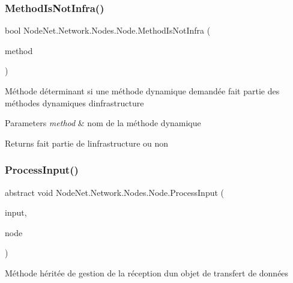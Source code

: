 \subsubsection{\texorpdfstring{Method\+Is\+Not\+Infra()}{MethodIsNotInfra()}}
{\footnotesize\ttfamily bool Node\+Net.\+Network.\+Nodes.\+Node.\+Method\+Is\+Not\+Infra (\begin{DoxyParamCaption}\item[{string}]{method }\end{DoxyParamCaption})\hspace{0.3cm}{\ttfamily [protected]}}



Méthode déterminant si une méthode dynamique demandée fait partie des méthodes dynamiques d\textquotesingle{}infrastructure 


\begin{DoxyParams}{Parameters}
{\em method} & nom de la méthode dynamique\\
\hline
\end{DoxyParams}
\begin{DoxyReturn}{Returns}
fait partie de l\textquotesingle{}infrastructure ou non
\end{DoxyReturn}
\mbox{\label{class_node_net_1_1_network_1_1_nodes_1_1_node_a953dce3f4779355cd3bf542ac6d1d3d8}} 
\subsubsection{\texorpdfstring{Process\+Input()}{ProcessInput()}}
{\footnotesize\ttfamily abstract void Node\+Net.\+Network.\+Nodes.\+Node.\+Process\+Input (\begin{DoxyParamCaption}\item[{\hyperlink{class_node_net_1_1_data_1_1_data_input}{Data\+Input}}]{input,  }\item[{\hyperlink{class_node_net_1_1_network_1_1_nodes_1_1_node}{Node}}]{node }\end{DoxyParamCaption})\hspace{0.3cm}{\ttfamily [pure virtual]}}



Méthode héritée de gestion de la réception d\textquotesingle{}un objet de transfert de données 


